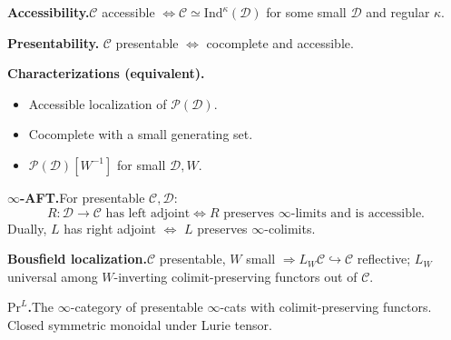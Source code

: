 \begin{formalrestatement}
\textbf{Accessibility.}\quad $\mathcal{C}$ accessible $\iff
\mathcal{C} \simeq \mathrm{Ind}^\kappa(\mathcal{D})$ for some small
$\mathcal{D}$ and regular $\kappa$.

\medskip
\textbf{Presentability.}\quad
$\mathcal{C}$ presentable $\iff$ cocomplete and accessible.

\medskip
\textbf{Characterizations (equivalent).}\quad
\begin{itemize}
  \item Accessible localization of $\mathcal{P}(\mathcal{D})$.
  \item Cocomplete with a small generating set.
  \item $\mathcal{P}(\mathcal{D})[W^{-1}]$ for small $\mathcal{D}, W$.
\end{itemize}

\medskip
\textbf{$\infty$-AFT.}\quad For presentable $\mathcal{C}, \mathcal{D}$:
\begin{equation*}
  R : \mathcal{D} \to \mathcal{C} \text{ has left adjoint} \iff
  R \text{ preserves } \infty\text{-limits and is accessible}.
\end{equation*}
Dually, $L$ has right adjoint $\iff$ $L$ preserves $\infty$-colimits.

\medskip
\textbf{Bousfield localization.}\quad $\mathcal{C}$ presentable,
$W$ small $\Rightarrow L_W \mathcal{C} \hookrightarrow \mathcal{C}$
reflective; $L_W$ universal among $W$-inverting colimit-preserving
functors out of $\mathcal{C}$.

\medskip
\textbf{$\mathrm{Pr}^L$.}\quad The $\infty$-category of presentable
$\infty$-cats with colimit-preserving functors. Closed symmetric monoidal
under Lurie tensor.
\end{formalrestatement}
